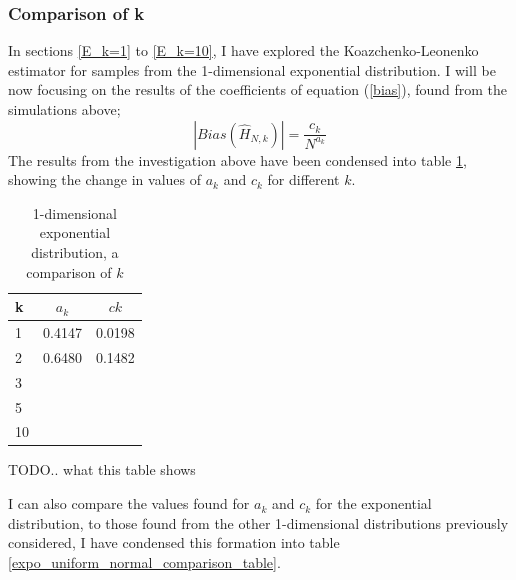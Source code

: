 \documentclass{article}
\begin{document}
\subsubsection{Comparison of k} \label{E_compare_k}



In sections \ref{E_k=1} to \ref{E_k=10}, I have explored the Koazchenko-Leonenko estimator for samples from the 1-dimensional exponential distribution. I will be now focusing on the results of the coefficients of equation (\ref{bias}), found from the simulations above;
\begin{equation}
|Bias(\hat{H}_{N, k})| = \frac{c_{k}}{N^{a_{k}}} \nonumber
\end{equation}
The results from the investigation above have been condensed into table \ref{expo_k_comparison_table}, showing the change in values of $a_{k}$ and $c_{k}$ for different $k$.

\begin{table}
\caption{1-dimensional exponential distribution, a comparison of $k$} \label{expo_k_comparison_table}
\begin{center}
\begin{tabular}{| l | c c|} 
\toprule
k & $a_{k}$ & $c{k}$ \\
\midrule[1pt]
1 &  0.4147  &  0.0198  \\
2 &  0.6480  &  0.1482 \\
3 &  & \\
5 &  &  \\
10 &  &   \\
\hline
\end{tabular}
\end{center}
\end{table}

TODO.. what this table shows

I can also compare the values found for $a_{k}$ and $c_{k}$ for the exponential distribution, to those found from the other 1-dimensional distributions previously considered, I have condensed this formation into table \ref{expo_uniform_normal_comparison_table}.
\end{document}
